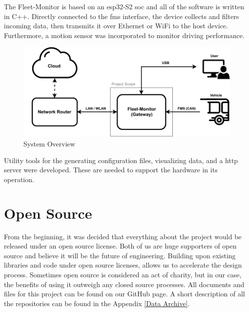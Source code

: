 The Fleet-Monitor is based on an \gls{esp32}-S2 \acrlong{soc} and all of the software is written in C++. Directly connected to the \acrshort{fms} interface, the device collects and filters incoming data, then transmits it over Ethernet or WiFi to the host device. Furthermore, a motion sensor was incorporated to monitor driving performance. 
\bigskip
\begin{figure}[h!]
	\centering
	\includegraphics[width=\textwidth]{images/System_Overview}
	\vspace{-0.3cm}
	\caption{System Overview}
	\label{fig:system-overview}
\end{figure}

Utility tools for the generating configuration files, visualizing data, and a \acrshort{http} server were developed. These are needed to support the hardware in its operation. 

\section{Open Source}
From the beginning, it was decided that everything about the project would be released under an open source license. Both of us are huge supporters of open source and believe it will be the future of engineering. Building upon existing libraries and code under open source licenses, allows us to accelerate the design process. Sometimes open source is considered an act of charity, but in our case, the benefits of using it outweigh any closed source processes. All documents and files for this project can be found on our GitHub page. A short description of all the repositories can be found in the Appendix \ref{Data Archive}.
